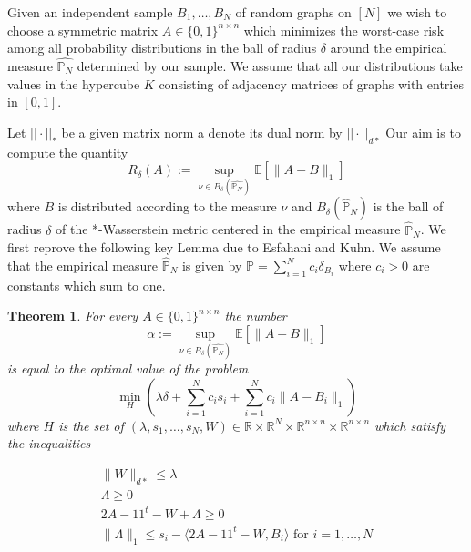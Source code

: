 \documentclass[12pt]{amsart}
\newtheorem{theorem}[lemma]{Theorem}
\numberwithin{equation}{section}
\newcommand{\PP}{\mathbb{P}}
\newcommand{\RR}{\mathbb{R}}
\newcommand{\EE}{\mathbb{E}}
\begin{document}
Given an independent sample $B_1,\dots, B_N$ of random graphs on $[N]$ we wish to choose a symmetric matrix $A\in \{0,1\}^{n\times n}$ which minimizes the worst-case risk among all probability distributions in the ball of radius $\delta$ around the empirical measure $\hat{\mathbb{P}_N}$ determined by our sample. We assume that all our distributions take values in the hypercube $K$ consisting of adjacency matrices of graphs with entries in $[0,1]$. 

Let $||\cdot||_{*}$ be a given matrix norm a denote its dual norm by $||\cdot||_{d*}$ Our aim is to compute the quantity
\[R_{\delta}(A):=\sup_{\nu\in B_{\delta}(\hat{\mathbb{P}_N})}\EE[\|A-B\|_1]\]
where $B$ is distributed according to the measure $\nu$ and $B_\delta(\hat{\mathbb{P}}_N)$ is the ball of radius $\delta$ of the *-Wasserstein metric centered in the empirical measure $\hat{\mathbb{P}}_N$. We first reprove the following key Lemma due to Esfahani and Kuhn. We assume that the empirical measure $\hat{\mathbb{P}}_N$ is given by $\PP=\sum_{i=1}^Nc_i\delta_{B_i}$ where $c_i>0$ are constants which sum to one. 

\begin{theorem}
\label{teoError}
For every $A\in \{0,1\}^{n\times n}$ the number \[\alpha:=\sup_{\nu\in B_{\delta}(\hat{\mathbb{P}_N})} \EE[\|A-B\|_1]\]
is equal to the optimal value of the problem
\[\min_{H} \left(\lambda\delta +\sum_{i=1}^N c_is_i+\sum_{i=1}^Nc_i\|A-B_i\|_1\right)\]
where $H$ is the set of $(\lambda, s_1,\dots, s_N, W)\in \RR\times\RR^N\times \RR^{n\times n} \times \RR^{n\times n}$ which satisfy the inequalities
\begin{center}
\[
\begin{array}{l}
\|W\|_{d*}\leq \lambda\\
\Lambda \geq 0\\
2A-11^t-W + \Lambda \geq 0\\
\|\Lambda\|_{1}\leq s_i-\langle 2A-11^t-W, B_i\rangle\text{ for $i=1,\dots, N$}
\end{array}
\]
\end{center}

\end{theorem}
\end{document}
